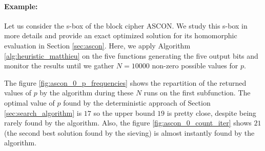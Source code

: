 \paragraph{Example:} Let us consider the s-box of the block cipher ASCON. We study this s-box in more details and provide an exact optimized solution for its homomorphic evaluation in Section \ref{sec:ascon}. Here, we apply Algorithm \ref{alg:heuristic_matthieu} on the five functions generating the five output bits and monitor the results until we gather $N=10000$ non-zero possible values for $p$.


The figure \ref{fig:ascon_0_p_frequencies} shows the repartition of the returned values of $p$ by the algorithm during these $N$ runs on the first subfunction. The optimal value of $p$ found by the deterministic approach of Section \ref{sec:search_algorithm} is $17$ so the upper bound $19$ is pretty close, despite being rarely found by the algorithm. Also, the figure \ref{fig:ascon_0_count_iter} shows $21$ (the second best solution found by the sieving) is almost instantly found by the algorithm.


